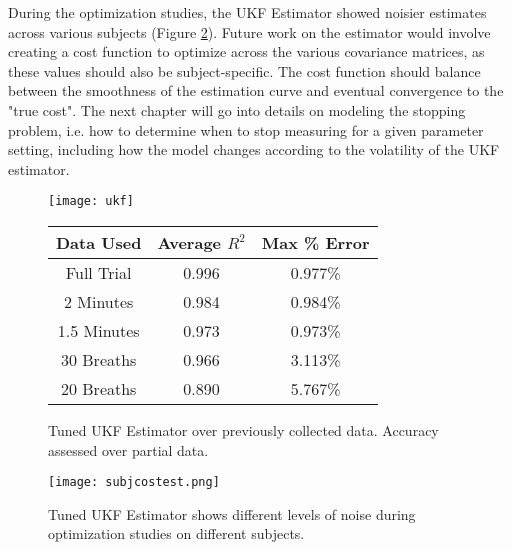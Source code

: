 During the optimization studies, the UKF Estimator showed noisier estimates across various subjects (Figure \ref{fig:subjcostest}). Future work on the estimator would involve creating a cost function to optimize across the various covariance matrices, as these values should also be subject-specific. The cost function should balance between the smoothness of the estimation curve and eventual convergence to the "true cost". The next chapter will go into details on modeling the stopping problem, i.e. how to determine when to stop measuring for a given parameter setting, including how the model changes according to the volatility of the UKF estimator. 

\begin{figure}[t]
\centering
\texttt{[image: ukf]}

\begin{tabular}{ |c|c|c| } 
 \hline
 Data Used & Average $R^2$ & Max \% Error \\ 
 \hline
 Full Trial & 0.996 & 0.977\% \\ 
 2 Minutes & 0.984 & 0.984\% \\ 
 1.5 Minutes & 0.973 & 0.973\% \\ 
 30 Breaths & 0.966 & 3.113\% \\ 
 20 Breaths & 0.890 & 5.767\% \\ 
 \hline
\end{tabular}%
\caption{Tuned UKF Estimator over previously collected data. Accuracy assessed over partial data.}
\label{fig:ukftuned}
\end{figure}

\begin{figure}[h]
\centering
\texttt{[image: subjcostest.png]}
\caption{Tuned UKF Estimator shows different levels of noise during optimization studies on different subjects.}
\label{fig:subjcostest}
\end{figure}